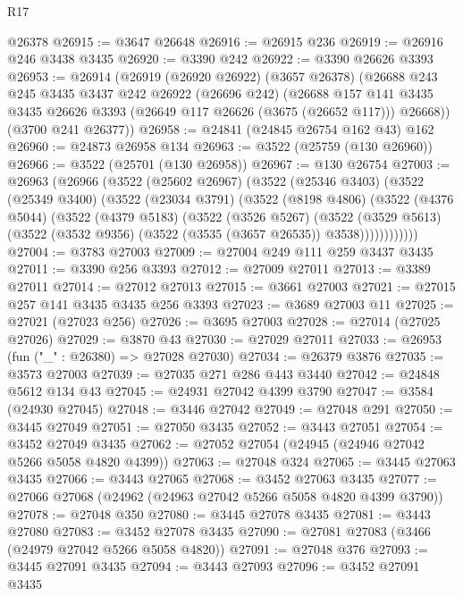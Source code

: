 \begin{lexlean}{R17}
\begin{coremodule}
    @26378
@26915 := @3647 @26648
@26916 := @26915 @236
@26919 := @26916 @246 @3438 @3435
@26920 := @3390 @242
@26922 := @3390 @26626 @3393
@26953 := @26914
    (@26919
      (@26920 @26922)
      (@3657 @26378)
      (@26688
        @243
        @245
        @3435
        @3437
        @242
        @26922
        (@26696 @242)
        (@26688
          @157
          @141
          @3435
          @3435
          @26626
          @3393
          (@26649 @117 @26626 (@3675 (@26652 @117)))
          @26668))
      (@3700 @241 @26377))
@26958 := @24841 (@24845 @26754 @162 @43) @162
@26960 := @24873 @26958 @134
@26963 := @3522 (@25759 (@130 @26960))
@26966 := @3522 (@25701 (@130 @26958))
@26967 := @130 @26754
@27003 := @26963
    (@26966
      (@3522
        (@25602 @26967)
        (@3522
          (@25346 @3403)
          (@3522
            (@25349 @3400)
            (@3522
              (@23034 @3791)
              (@3522
                (@8198 @4806)
                (@3522
                  (@4376 @5044)
                  (@3522
                    (@4379 @5183)
                    (@3522
                      (@3526 @5267)
                      (@3522
                        (@3529 @5613)
                        (@3522 (@3532 @9356) (@3522 (@3535 (@3657 @26535)) @3538))))))))))))
@27004 := @3783 @27003
@27009 := @27004 @249 @111 @259 @3437 @3435
@27011 := @3390 @256 @3393
@27012 := @27009 @27011
@27013 := @3389 @27011
@27014 := @27012 @27013
@27015 := @3661 @27003
@27021 := @27015 @257 @141 @3435 @3435 @256 @3393
@27023 := @3689 @27003 @11
@27025 := @27021 (@27023 @256)
@27026 := @3695 @27003
@27028 := @27014 (@27025 @27026)
@27029 := @3870 @43
@27030 := @27029 @27011
@27033 := @26953 (fun ("_" : @26380) => @27028 @27030)
@27034 := @26379 @3876
@27035 := @3573 @27003
@27039 := @27035 @271 @286 @443 @3440
@27042 := @24848 @5612 @134 @43
@27045 := @24931 @27042 @4399 @3790
@27047 := @3584 (@24930 @27045)
@27048 := @3446 @27042
@27049 := @27048 @291
@27050 := @3445 @27049
@27051 := @27050 @3435
@27052 := @3443 @27051
@27054 := @3452 @27049 @3435
@27062 := @27052 @27054 (@24945 (@24946 @27042 @5266 @5058 @4820 @4399))
@27063 := @27048 @324
@27065 := @3445 @27063 @3435
@27066 := @3443 @27065
@27068 := @3452 @27063 @3435
@27077 := @27066 @27068 (@24962 (@24963 @27042 @5266 @5058 @4820 @4399 @3790))
@27078 := @27048 @350
@27080 := @3445 @27078 @3435
@27081 := @3443 @27080
@27083 := @3452 @27078 @3435
@27090 := @27081 @27083 (@3466 (@24979 @27042 @5266 @5058 @4820))
@27091 := @27048 @376
@27093 := @3445 @27091 @3435
@27094 := @3443 @27093
@27096 := @3452 @27091 @3435

\end{coremodule}
\end{lexlean}
